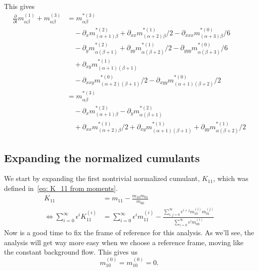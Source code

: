 \documentclass{article}
\begin{document}
This gives
\begin{equation}
  \label{eq:third order in epsilon}
  \begin{aligned}
    \frac{\partial}{\partial t} m_{\alpha\beta}^{(1)} + m_{\alpha\beta}^{(3)}
    & =  m_{\alpha\beta}^{*(3)} \\
    &\quad - \partial_x m_{(\alpha+1)\beta}^{*(2)} + \partial_{xx} m_{(\alpha+2)\beta}^{*(1)}/2 - \partial_{xxx} m_{(\alpha+3)\beta}^{*(0)}/6 \\
    &\quad - \partial_y m_{\alpha(\beta+1)}^{*(2)} + \partial_{yy} m_{\alpha(\beta+2)}^{*(1)}/2 - \partial_{yyy} m_{\alpha(\beta+3)}^{*(0)}/6 \\
    &\quad + \partial_{xy} m_{(\alpha+1)(\beta+1)}^{*(1)} \\
    &\quad - \partial_{xxy} m_{(\alpha+2)(\beta+1)}^{*(0)}/2 - \partial_{xyy} m_{(\alpha+1)(\beta+2)}^{*(0)}/2 \\
    & =  m_{\alpha\beta}^{*(3)} \\
    &\quad - \partial_x m_{(\alpha+1)\beta}^{*(2)} - \partial_y m_{\alpha(\beta+1)}^{*(2)}  \\
    &\quad  + \partial_{xx} m_{(\alpha+2)\beta}^{*(1)}/2 + \partial_{xy} m_{(\alpha+1)(\beta+1)}^{*(1)} + \partial_{yy} m_{\alpha(\beta+2)}^{*(1)}/2
  \end{aligned}
\end{equation}

\subsection{Expanding the normalized cumulants}
\label{sub:Expanding the normalized cumulants}
We start by expanding the first nontrivial normalized cumulant, $K_{11}$, which was defined in~\eqref{eq: K_11 from moments}.
\begin{equation}
  \begin{aligned}
    K_{11} & = m_{11} - \frac{m_{10}m_{01}}{m_{00}}\\
    \Leftrightarrow
    \sum_{i=0}^\infty \epsilon^i K_{11}^{(i)}
    & = \sum_{i=0}^\infty \epsilon^i m_{11}^{(i)} -
    \frac{\sum_{i,j=0}^\infty \epsilon^{i+j} m_{10}^{(i)}m_{01}^{(j)}}
         {\sum_{i=0}^\infty \epsilon^i m_{00}^{(i)}}
  \end{aligned}
\end{equation}
Now is a good time to fix the frame of reference for this analysis. As we'll see, the analysis will get way more easy when we choose a reference frame, moving like the constant background flow. This gives us
\begin{equation}
  \label{eq: frame of reference}
  m_{10}^{(0)}=m_{10}^{(0)} = 0.
\end{equation}
\end{document}
